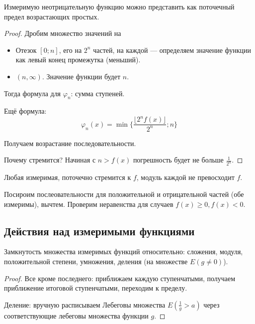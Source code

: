 \documentclass[12pt, a4paper, oneside]{memoir}
\begin{document}
\begin{theorem}

    Измеримую неотрицательную функцию можно представить
    как поточечный предел возрастающих простых.

    \begin{proof}
        Дробим множество значений на
        \begin{itemize}
            \item Отезок $[0; n]$, его на $2^n$ частей, на каждой — 
            определяем значение функции как левый конец промежутка (меньший).
            \item $(n, \infty)$. Значение функции будет $n$.
        \end{itemize}

        Тогда формула для $\varphi_n$: сумма ступеней.


        Ещё формула:
        \begin{equation}
            \varphi_n(x) = \min \{\frac{\lfloor 2^n f(x) \rfloor}{2^n} ; n \}
        \end{equation}

        Получаем возрастание последовательности.

        Почему стремится? Начиная с $n > f(x)$ погрешность будет не больше $\frac{1}{2^n}$.
    \end{proof}
\end{theorem}

\begin{corollary}

    Любая измеримая, поточечно стремится к $f$, модуль каждой не превосходит $f$.

    Посироим послеовательности для положительной и отрицательной частей (обе измеримы), вычтем.
    Проверим неравенства для случаев $f(x) \geqslant 0, f(x) < 0$.
\end{corollary}


\subsection{Действия над измеримыми функциями}


\begin{theorem}

    Замкнутость множества измеримых функций относительно:
    сложения, модуля, положительной степени, умножения, деления (на множестве $E(g \neq 0)$).

    \begin{proof}
        Все кроме последнего: 
        приближаем каждую ступенчатыми,
        получаем приближение итоговой ступенчатыми,
        переходим к пределу.

        Деление: вручную расписываем Лебеговы множества 
        $E\left(\frac{1}{g} > a\right)$ через соответствующие лебеговы множества функции $g$.
    \end{proof}
\end{theorem}
\end{document}
